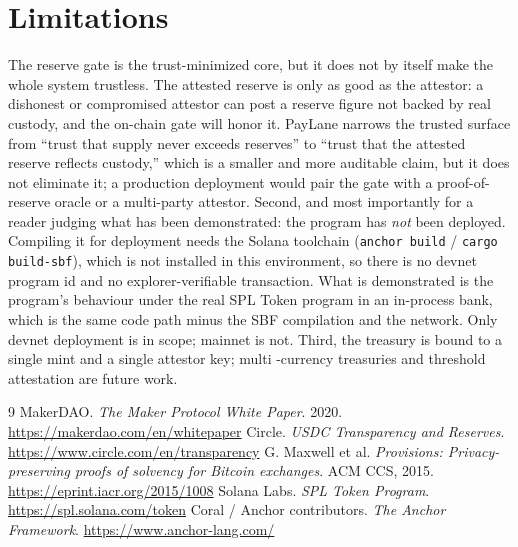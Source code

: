 \documentclass[10pt,twocolumn]{article}
\begin{document}
\section{Limitations}
The reserve gate is the trust-minimized core, but it does not by itself make the
whole system trustless. The attested reserve is only as good as the attestor: a
dishonest or compromised attestor can post a reserve figure not backed by real
custody, and the on-chain gate will honor it. PayLane narrows the trusted surface
from ``trust that supply never exceeds reserves'' to ``trust that the attested
reserve reflects custody,'' which is a smaller and more auditable claim, but it
does not eliminate it; a production deployment would pair the gate with a
proof-of-reserve oracle or a multi-party attestor. Second, and most importantly for
a reader judging what has been demonstrated: the program has \emph{not} been
deployed. Compiling it for deployment needs the Solana toolchain
(\texttt{anchor build} / \texttt{cargo build-sbf}), which is not installed in this
environment, so there is no devnet program id and no explorer-verifiable
transaction. What is demonstrated is the program's behaviour under the real SPL
Token program in an in-process bank, which is the same code path minus the SBF
compilation and the network. Only devnet deployment is in scope; mainnet is not.
Third, the treasury is bound to a single mint and a single attestor key; multi
-currency treasuries and threshold attestation are future work.

\begin{thebibliography}{9}
 MakerDAO. \emph{The Maker Protocol White Paper}. 2020. \url{https://makerdao.com/en/whitepaper}
 Circle. \emph{USDC Transparency and Reserves}. \url{https://www.circle.com/en/transparency}
 G. Maxwell et al. \emph{Provisions: Privacy-preserving proofs of solvency for Bitcoin exchanges}. ACM CCS, 2015. \url{https://eprint.iacr.org/2015/1008}
 Solana Labs. \emph{SPL Token Program}. \url{https://spl.solana.com/token}
 Coral / Anchor contributors. \emph{The Anchor Framework}. \url{https://www.anchor-lang.com/}
\end{thebibliography}
\end{document}
